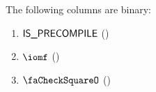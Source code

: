 The following columns are binary:
\begin{multicols}{2}
\begin{enumerate}
	\item $\textsf{IS\_PRECOMPILE}$ \quad (\trash)
	\item $\iomf$ \quad (\trash)
	\item $\done$ \quad (\trash)
\end{enumerate}
\end{multicols}

